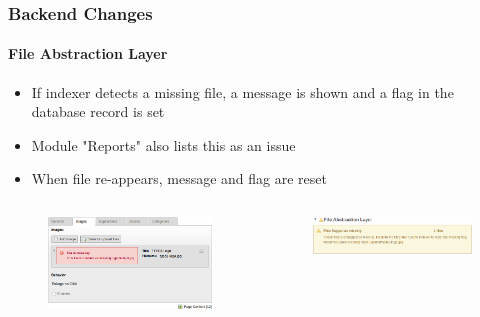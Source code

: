 \begin{frame}[fragile]
	\frametitle{Backend Changes}
	\framesubtitle{File Abstraction Layer}

	\begin{itemize}
		\item If indexer detects a missing file, a message is shown and a flag in the database record is set
		\item Module "Reports" also lists this as an issue
		\item When file re-appears, message and flag are reset
	\end{itemize}

	\begin{columns}[T]

		\begin{column}{.5\textwidth}
			\begin{figure}
				\includegraphics[width=0.95\linewidth]{Images/BackendChanges/FalMissingFileContentElement.png}
			\end{figure}
		\end{column}

		\begin{column}{.5\textwidth}
			\begin{figure}
				\includegraphics[width=0.95\linewidth]{Images/BackendChanges/FalMissingFileReportsModule.png}
			\end{figure}
		\end{column}

	\end{columns}

\end{frame}

